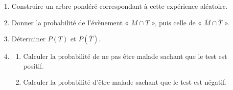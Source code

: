 \documentclass[11pt]{article}
\begin{document}
\begin{enumerate}
  \item Construire un arbre pondéré correspondant à cette expérience aléatoire.
  \item Donner la probabilité de l'évènement « $M \cap T$ », puis celle de « $\overline{M} \cap \overline{T}$ ».
  \item Déterminer $P(T)$ et $P(\overline{T})$.
  \item \begin{enumerate}[label=\alph*.]
    \item Calculer la probabilité de ne pas être malade sachant que le test est positif.
    \item Calculer la probabilité d'être malade sachant que le test est négatif.
  \end{enumerate}
\end{enumerate}
\end{document}
